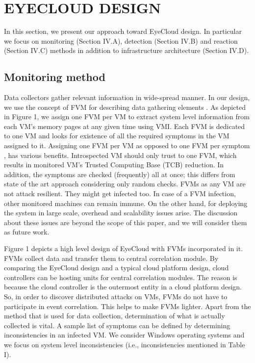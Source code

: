 \documentclass[conference]{IEEEtran}
\begin{document}
\section{EYECLOUD DESIGN}
In this section, we present our approach toward EyeCloud design. In particular we focus on monitoring (Section IV.A), detection (Section IV.B) and reaction (Section IV.C) methods in addition to infrastructure architecture (Section IV.D).
\subsection{Monitoring method}
Data collectors gather relevant information in wide-spread manner. In our design, we use the concept of FVM for describing data gathering elements \cite{ref7}. As depicted in Figure 1, we assign one FVM per VM to extract system level information from each VM's memory pages at any given time using VMI. Each FVM is dedicated to one VM and looks for existence of all the required symptoms in the VM assigned to it. Assigning one FVM per VM as opposed to one FVM per symptom \cite{ref7}, has various benefits. Introspected VM should only trust to one FVM, which results in monitored VM's Trusted Computing Base (TCB) reduction. In addition, the symptoms are checked (frequently) all at once; this differs from state of the art approach considering only random checks. FVMs as any VM are not attack resilient. They might get infected too. In case of a FVM infection, other monitored machines can remain immune. On the other hand, for deploying the system in large scale, overhead and scalability issues arise. The discussion about these issues are beyond the scope of this paper, and we will consider them as future work.    
 
Figure 1 depicts a high level design of EyeCloud with FVMs incorporated in it. FVMs collect data and transfer them to central correlation module. By comparing the EyeCloud design and a typical cloud platform design, cloud controllers can be hosting units for central correlation modules. The reason is because the cloud controller is the outermost entity in a cloud platform design. So, in order to discover distributed attacks on VMs, FVMs do not have to participate in event correlation. This helps to make FVMs lighter. Apart from the method that is used for data collection, determination of what is actually collected is vital. A sample list of symptoms can be defined by determining inconsistencies in an infected VM. We consider Windows operating systems and we focus on system level inconsistencies (i.e., inconsistencies mentioned in Table I). 
\end{document}
